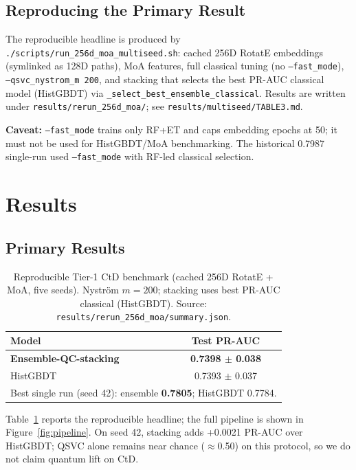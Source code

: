 \documentclass[10pt,twocolumn]{article}
\begin{document}
\subsection{Reproducing the Primary Result}\label{sec:exp_repro}

The reproducible headline is produced by \texttt{./scripts/run\_256d\_moa\_multiseed.sh}: cached 256D RotatE embeddings (symlinked as 128D paths), MoA features, full classical tuning (no \texttt{--fast\_mode}), \texttt{--qsvc\_nystrom\_m 200}, and stacking that selects the best PR-AUC classical model (HistGBDT) via \texttt{\_select\_best\_ensemble\_classical}. Results are written under \texttt{results/rerun\_256d\_moa/}; see \texttt{results/multiseed/TABLE3.md}.

\textbf{Caveat:} \texttt{--fast\_mode} trains only RF+ET and caps embedding epochs at 50; it must not be used for HistGBDT/MoA benchmarking. The historical 0.7987 single-run used \texttt{--fast\_mode} with RF-led classical selection.

\section{Results}

\subsection{Primary Results}

\begin{table}[t]
\centering
\caption{Reproducible Tier-1 CtD benchmark (cached 256D RotatE + MoA, five seeds).
Nystr\"{o}m $m{=}200$; stacking uses best PR-AUC classical (HistGBDT).
Source: \texttt{results/rerun\_256d\_moa/summary.json}.}
\label{tab:primary}
\begin{tabular}{@{}lc@{}}
\toprule
\textbf{Model} & \textbf{Test PR-AUC} \\
\midrule
\textbf{Ensemble-QC-stacking} & \textbf{0.7398 $\pm$ 0.038} \\
HistGBDT & 0.7393 $\pm$ 0.037 \\
\midrule
\multicolumn{2}{l}{\footnotesize Best single run (seed 42): ensemble \textbf{0.7805}; HistGBDT 0.7784.} \\
\bottomrule
\end{tabular}
\end{table}

Table~\ref{tab:primary} reports the reproducible headline; the full pipeline is shown in Figure~\ref{fig:pipeline}.
On seed 42, stacking adds +0.0021 PR-AUC over HistGBDT; QSVC alone remains near chance ($\approx$0.50) on this protocol, so we do not claim quantum lift on CtD.
\end{document}
